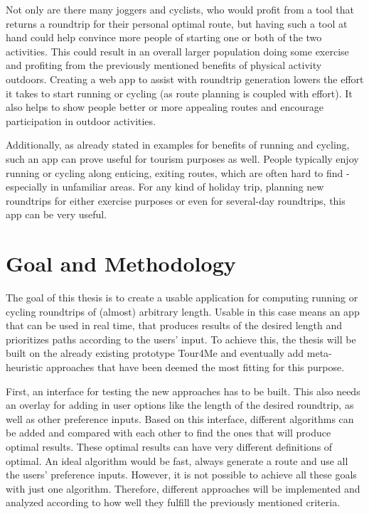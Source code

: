 Not only are there many joggers and cyclists, who would profit from a tool that returns a roundtrip for their personal optimal route, but having such a tool at hand could help convince more people of starting one or both of the two activities.
This could result in an overall larger population doing some exercise and profiting from the previously mentioned benefits of physical activity outdoors. 
Creating a web app to assist with roundtrip generation lowers the effort it takes to start running or cycling (as route planning is coupled with effort).
It also helps to show people better or more appealing routes and encourage participation in outdoor activities.

Additionally, as already stated in examples for benefits of running and cycling, such an app can prove useful for tourism purposes as well. 
People typically enjoy running or cycling along enticing, exiting routes, which are often hard to find - especially in unfamiliar areas.
For any kind of holiday trip, planning new roundtrips for either exercise purposes or even for several-day roundtrips, this app can be very useful.


\section{Goal and Methodology}
\label{sec:goal}


The goal of this thesis is to create a usable application for computing running or cycling roundtrips of (almost) arbitrary length. 
Usable in this case means an app that can be used in real time, that produces results of the desired length and prioritizes paths according to the users' input. 
To achieve this, the thesis will be built on the already existing prototype Tour4Me and eventually add meta-heuristic approaches that have been deemed the most fitting for this purpose. 

First, an interface for testing the new approaches has to be built. This also needs an overlay for adding in user options like the length of the desired roundtrip, as well as other preference inputs. 
Based on this interface, different algorithms can be added and compared with each other to find the ones that will produce optimal results.
These optimal results can have very different definitions of optimal. 
An ideal algorithm would be fast, always generate a route and use all the users' preference inputs.
However, it is not possible to achieve all these goals with just one algorithm. 
Therefore, different approaches will be implemented and analyzed according to how well they fulfill the previously mentioned criteria. 

